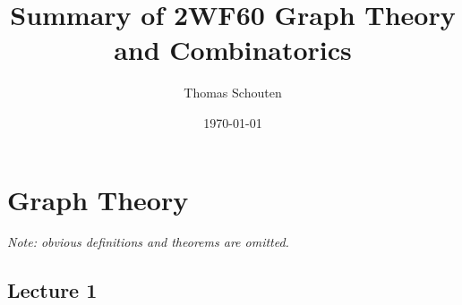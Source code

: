 \documentclass{report}
\title{Summary of 2WF60 Graph Theory and Combinatorics}
\author{Thomas Schouten}
\date{\today}
\begin{document}
    \maketitle
    \tableofcontents

    \chapter*{Graph Theory}\label{ch:graphTheory}
    \textsl{Note: obvious definitions and theorems are omitted.}

    \section{Lecture 1}\label{sec:lecture1}
    

    \printindex
\end{document}
